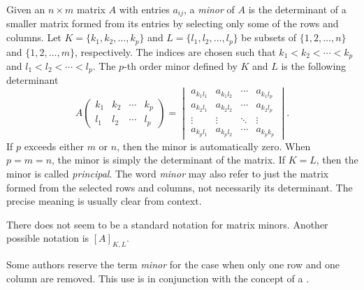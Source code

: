 \documentclass[12pt]{article}
\begin{document}

Given an $n\times m$ matrix $A$ with entries $a_{ij}$, a \emph{minor} of $A$ is
the determinant of a smaller matrix formed from its entries by selecting
only some of the rows and columns. Let $K=\{k_1,k_2,\ldots,k_p\}$ and
$L=\{l_1,l_2,\ldots,l_p\}$ be subsets of $\{1,2,\ldots,n\}$ and
$\{1,2,\ldots,m\}$, respectively. The indices are chosen such that
$k_1 < k_2 < \cdots < k_p$ and $l_1 < l_2 < \cdots < l_p$. The $p$-th
order minor defined by $K$ and $L$ is the following determinant
\begin{equation*}
  A\begin{pmatrix} k_1 & k_2 & \cdots & k_p \\
    l_1 & l_2 & \cdots & l_p \end{pmatrix} =
  \begin{vmatrix}
    a_{k_1 l_1} & a_{k_1 l_2} & \cdots & a_{k_1 l_p} \\
    a_{k_2 l_1} & a_{k_2 l_2} & \cdots & a_{k_2 l_p} \\
    \vdots      & \vdots      & \ddots & \vdots      \\
    a_{k_p l_1} & a_{k_p l_2} & \cdots & a_{k_p k_p}
  \end{vmatrix}.
\end{equation*}
If $p$ exceeds either $m$ or $n$, then the minor is
automatically zero. When $p=m=n$, the minor is simply the determinant
of the matrix. If $K=L$, then the minor is called \emph{principal}.
The word \emph{minor} may also refer to just the matrix formed from
the selected rows and columns, not necessarily its determinant. The precise
meaning is usually clear from context.

There does not seem to be a standard notation for matrix minors.
Another possible notation is $[A]_{K,L}$.

Some authors reserve the term \emph{minor} for the case when only one
row and one column are removed. This use is in conjunction with the
concept of a \emph{}.
\end{document}
